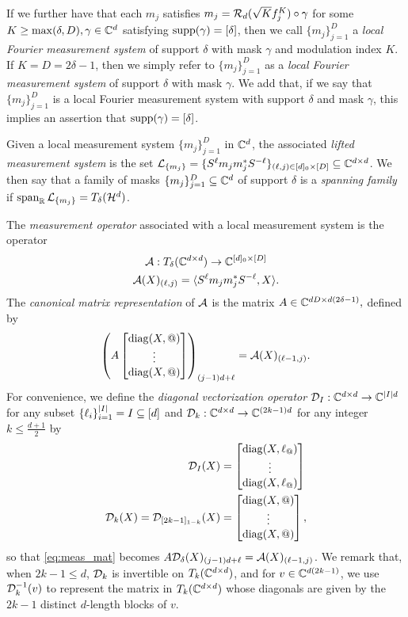 If we further have that each $m_j$ satisfies $m_j = \mathcal{R}_d(\sqrt{K} f_j^K) \circ \gamma$ for some $K \ge \max(\delta, D), \gamma \in \mathbb{C}^d$ satisfying $\operatorname{supp}(\gamma) = [\delta]$, then we call $\{m_j\}_{j = 1}^D$ a \emph{local Fourier measurement system} of support $\delta$ with mask $\gamma$ and modulation index $K$.  If $K = D = 2 \delta - 1$, then we simply refer to $\{m_j\}_{j = 1}^D$ as a \emph{local Fourier measurement system} of support $\delta$ with mask $\gamma$.  We add that, if we say that $\{m_j\}_{j = 1}^D$ is a local Fourier measurement system with support $\delta$ and mask $\gamma$, this implies an assertion that $\operatorname{supp}(\gamma) = [\delta]$.

Given a local measurement system $\{m_j\}_{j = 1}^D$ in $\mathbb{C}^d$, the associated \emph{lifted measurement system} is the set $\mathcal{L}_{\{m_j\}} = \{S^{\ell} m_j m_j^* S^{- \ell}\}_{(\ell, j) \in [d]_0 \times [D]} \subseteq \mathbb{C}^{d \times d}$.  We then say that a family of masks $\{m_j\}_{j = 1}^D \subseteq \mathbb{C}^d$ of support $\delta$ is a \emph{spanning family} if $\operatorname{span}_{\mathbb{R}} \mathcal{L}_{\{m_j\}} = T_\delta(\mathcal{H}^d)$.

The \emph{measurement operator} associated with a local measurement system is the operator
  \begin{gather}
    \mathcal{A} : T_\delta(\mathbb{C}^{d \times d}) \to \mathbb{C}^{[d]_0 \times [D]} \nonumber \\
    \mathcal{A}(X)_{(\ell, j)} = \langle S^{\ell} m_j m_j^* S^{-\ell}, X \rangle. \label{eq:meas_op}
  \end{gather}
  The \emph{canonical matrix representation} of $\mathcal{A}$ is the matrix $A \in \mathbb{C}^{d D \times d (2 \delta - 1)},$ defined by
  \begin{equation}
    \left(A \colmatfun{\diag(X, @)}{1 - \delta}{\delta - 1}\right)_{(j - 1) d + \ell} = \Ac(X)_{(\ell - 1, j)}.
    \label{eq:meas_mat}
  \end{equation}
  For convenience, we define the \emph{diagonal vectorization operator} $\mathcal{D}_I : \mathbb{C}^{d \times d} \to \mathbb{C}^{\lvert I\rvert d}$ for any subset $\{\ell_i\}_{i = 1}^{\lvert I\rvert} = I \subseteq [d]$ and $\mathcal{D}_k : \mathbb{C}^{d \times d} \to \mathbb{C}^{(2 k - 1) d}$ for any integer $k \le \frac{d + 1}{2}$ by
  \begin{align}
    \Dc_I(X) &= \colmatfun{\diag(X, \ell_@)}{1}{\abs{I}}
    \label{eq:diag_vec_set} \\
    \Dc_k(X) = \Dc_{[2 k - 1]_{1 - k}}(X) &= \colmatfun{\diag(X, @)}{1 - k}{k - 1},
    \label{eq:diag_vec}
  \end{align}
  so that \eqref{eq:meas_mat} becomes $A \mathcal{D}_{\delta} (X)_{(j - 1) d + \ell} = \mathcal{A}(X)_{(\ell - 1, j)}$.  We remark that, when $2 k - 1 \le d$, $\mathcal{D}_k$ is invertible on $T_k(\mathbb{C}^{d \times d})$, and for $v \in \mathbb{C}^{d (2 k - 1)}$, we use $\mathcal{D}_k^{-1}(v)$ to represent the matrix in $T_k(\mathbb{C}^{d \times d})$ whose diagonals are given by the $2k - 1$ distinct $d$-length blocks of $v$.

